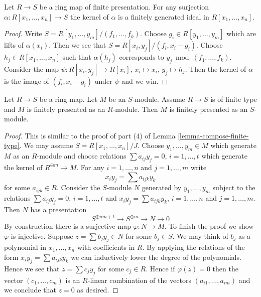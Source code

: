 \begin{lemma}
\label{lemma-finite-presentation-independent}
Let $R \to S$ be a ring map of finite presentation.
For any surjection $\alpha : R[x_1, \ldots, x_n] \to S$ the
kernel of $\alpha$ is a finitely generated ideal in $R[x_1, \ldots, x_n]$.
\end{lemma}

\begin{proof}
Write $S = R[y_1, \ldots, y_m]/(f_1, \ldots, f_k)$.
Choose $g_i \in R[y_1, \ldots, y_m]$ which are lifts
of $\alpha(x_i)$. Then we see that $S = R[x_i, y_j]/(f_l, x_i - g_i)$.
Choose $h_j \in R[x_1, \ldots, x_n]$ such that $\alpha(h_j)$
corresponds to $y_j \bmod (f_1, \ldots, f_k)$. Consider
the map $\psi : R[x_i, y_j] \to R[x_i]$, $x_i \mapsto x_i$,
$y_j \mapsto h_j$. Then the kernel of $\alpha$
is the image of $(f_l, x_i - g_i)$ under $\psi$ and we win.
\end{proof}

\begin{lemma}
\label{lemma-finitely-presented-over-subring}
Let $R \to S$ be a ring map.
Let $M$ be an $S$-module.
Assume $R \to S$ is of finite type and
$M$ is finitely presented as an $R$-module.
Then $M$ is finitely presented as an $S$-module.
\end{lemma}

\begin{proof}
This is similar to the proof of part (4) of
Lemma \ref{lemma-compose-finite-type}.
We may assume $S = R[x_1, \ldots, x_n]/J$.
Choose $y_1, \ldots, y_m \in M$ which generate $M$ as an $R$-module
and choose relations $\sum a_{ij} y_j = 0$, $i = 1, \ldots, t$ which
generate the kernel of $R^{\oplus m} \to M$. For any
$i = 1, \ldots, n$ and $j = 1, \ldots, m$ write
$$
x_i y_j = \sum a_{ijk} y_k
$$
for some $a_{ijk} \in R$. Consider the $S$-module $N$ generated by
$y_1, \ldots, y_m$ subject to the relations
$\sum a_{ij} y_j = 0$, $i = 1, \ldots, t$ and
$x_i y_j = \sum a_{ijk} y_k$, $i = 1, \ldots, n$ and $j = 1, \ldots, m$.
Then $N$ has a presentation
$$
S^{\oplus nm + t} \longrightarrow S^{\oplus m} \longrightarrow N
\longrightarrow 0
$$
By construction there is a surjective map $\varphi : N \to M$.
To finish the proof we show $\varphi$ is injective.
Suppose $z = \sum b_j y_j \in N$ for some $b_j \in S$.
We may think of $b_j$ as a polynomial in $x_1, \ldots, x_n$
with coefficients in $R$.
By applying the relations of the form $x_i y_j = \sum a_{ijk} y_k$
we can inductively lower the degree of the polynomials.
Hence we see that $z = \sum c_j y_j$ for some $c_j \in R$.
Hence if $\varphi(z) = 0$ then the vector $(c_1, \ldots, c_m)$
is an $R$-linear combination of the vectors $(a_{i1}, \ldots, a_{im})$
and we conclude that $z = 0$ as desired.
\end{proof}





